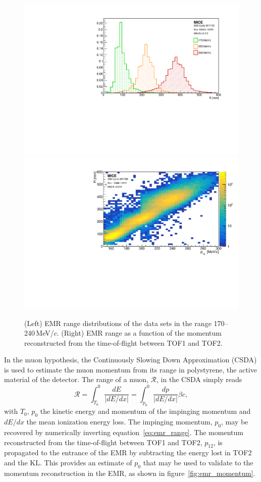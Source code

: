 \begin{figure}[htb!]
	\begin{center}
		\includegraphics[width=0.49\columnwidth]{range_multi.pdf}
		\hfill
		\includegraphics[width=0.49\columnwidth]{range_mom.pdf}
		\caption{(Left) EMR range distributions of the data sets in the range 170--240\,MeV/$c$. (Right) EMR range as a function of the momentum reconstructed from the time-of-flight between TOF1 and TOF2.}
		\label{fig:emr_range}
	\end{center}
\end{figure}

In the muon hypothesis, the Continuously Slowing Down Approximation (CSDA) is used to estimate the muon momentum from its range in polystyrene, the active material of the detector. The range of a muon, $\mathcal{R}$, in the CSDA simply reads
\begin{equation}
\mathcal{R} = \int_{T_0}^{0}\frac{dE}{|dE/dx|} = \int_{p_0}^{0}\frac{dp}{|dE/dx|} \beta c,
\label{eq:emr_range}
\end{equation}
with $T_0$, $p_0$ the kinetic energy and momentum of the impinging momentum and $dE/dx$ the mean ionization energy loss. The impinging momentum, $p_0$, may be recovered by numerically inverting equation~\ref{eq:emr_range}. The momentum reconstructed from the time-of-flight between TOF1 and TOF2, $p_{12}$, is propagated to the entrance of the EMR by subtracting the energy lost in TOF2 and the KL. This provides an estimate of $p_0$ that may be used to validate to the momentum reconstruction in the EMR, as shown in figure~\ref{fig:emr_momentum}. 

